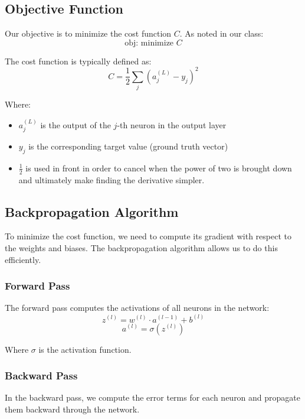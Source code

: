 \subsection{Objective Function}
Our objective is to minimize the cost function $C$. As noted in our class:
\begin{equation}
\text{obj: minimize } C
\end{equation}

The cost function is typically defined as:
\begin{equation}
C = \frac{1}{2}\sum_j (a_j^{(L)} - y_j)^2
\end{equation}

Where:
\begin{itemize}
    \item $a_j^{(L)}$ is the output of the $j$-th neuron in the output layer
    \item $y_j$ is the corresponding target value (ground truth vector)
    \item $\frac{1}{2}$ is used in front in order to cancel when the power of two is brought down and ultimately make finding the derivative simpler.
\end{itemize}

\subsection{Backpropagation Algorithm}
To minimize the cost function, we need to compute its gradient with respect to the weights and biases. The backpropagation algorithm allows us to do this efficiently.

\subsubsection{Forward Pass}
The forward pass computes the activations of all neurons in the network:
\begin{equation}
z^{(l)} = w^{(l)} \cdot a^{(l-1)} + b^{(l)}
\end{equation}
\begin{equation}
a^{(l)} = \sigma(z^{(l)})
\end{equation}

Where $\sigma$ is the activation function.

\subsubsection{Backward Pass}
In the backward pass, we compute the error terms for each neuron and propagate them backward through the network.

